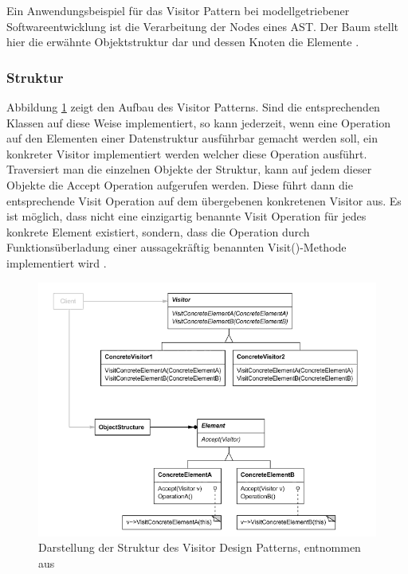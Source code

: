 \documentclass[12pt,oneside,a4paper,parskip]{scrbook}
\begin{document}
Ein Anwendungsbeispiel für das Visitor Pattern bei modellgetriebener Softwareentwicklung ist die Verarbeitung der Nodes eines AST. Der Baum stellt hier die erwähnte Objektstruktur dar und dessen Knoten die Elemente \cite[S. 480]{gamma2015}.

\subsubsection{Struktur}

Abbildung \ref{fig:visitor} zeigt den Aufbau des Visitor Patterns. Sind die entsprechenden Klassen auf diese Weise implementiert, so kann jederzeit, wenn eine Operation auf den Elementen einer Datenstruktur ausführbar gemacht werden soll, ein konkreter Visitor implementiert werden welcher diese Operation ausführt. Traversiert man die einzelnen Objekte der Struktur, kann auf jedem dieser Objekte die Accept Operation aufgerufen werden. Diese führt dann die entsprechende Visit Operation auf dem übergebenen konkretenen Visitor aus. Es ist möglich, dass nicht eine einzigartig benannte Visit Operation für jedes konkrete Element existiert, sondern, dass die Operation durch Funktionsüberladung einer aussagekräftig benannten Visit()-Methode implementiert wird \cite[S.485 ff.]{gamma2015}.

\begin{figure}[htbp]
	\centering
	\includegraphics[width=1.0\textwidth]{bilder/visitor}
	\caption{Darstellung der Struktur des Visitor Design Patterns, entnommen aus \cite[S. 485]{gamma2015}}
	\label{fig:visitor}
\end{figure}
\end{document}
